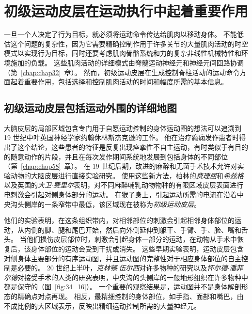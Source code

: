 \section{初级运动皮层在运动执行中起着重要作用}

一旦一个人决定了行为目标，就必须将运动命令传达给肌肉以移动身体。
不能低估这个问题的复杂性，因为它需要精确控制作用于许多关节的大量肌肉活动的时空模式以实现行为目标，同时还要考虑肌肉骨骼系统和力的复杂非线性机械特性和环境施加的负载。
这些肌肉活动的详细模式由脊髓运动神经元和神经元间回路协调（第~\ref{chap:chap32}~章）。
然而，初级运动皮层在生成控制脊柱活动的运动命令方面起着重要作用，包括选择和控制肌肉活动的时间和幅度所需的基本信息。



\subsection{初级运动皮层包括运动外围的详细地图}

大脑皮层的局部区域包含专门用于自愿运动控制的身体运动图的想法可以追溯到 19 世纪中叶英国神经学家约翰休林斯杰克逊的工作。
他在治疗癫痫发作患者时得出了这个结论，这些患者的特征是反复出现痉挛性不自主运动，有时类似于有目的的随意动作的片段，并且在每次发作期间系统地发展到包括身体的不同部位（第~\ref{chap:chap58}~章）。
在 19 世纪后期，改进的麻醉和无菌手术技术允许对实验动物的大脑皮层进行直接实验研究。
使用这些新方法，柏林的\textit{费理屈}和\textit{希兹格}以及英国的\textit{大卫$\cdot$费里尔}表明，对不同麻醉哺乳动物物种的有限区域皮层表面进行电刺激会引起对侧身体部分的运动。
在猴子身上，引起运动所需的电流在沿着中央沟头侧岸的一条窄带中最低，该区域现在被称为\textit{初级运动皮层}。


他们的实验表明，在这条组织带内，对相邻部位的刺激会引起相邻身体部位的运动，从内侧的脚、腿和尾巴开始，然后向外侧延伸到躯干、手臂、手、脸、嘴和舌头。
当他们损伤皮层部位时，刺激会引起身体一部分的运动，在动物从手术中恢复后，该身体部位的运动会受到干扰或消失。
这些早期实验表明，运动皮层包含对侧身体主要部分的有序运动图，并且运动图的完整性对于相应身体部位的自主控制是必要的。
20 世纪上半叶，\textit{克林顿$\cdot$伍尔西}对许多物种的研究以及\textit{怀尔德$\cdot$潘菲尔德}对接受手术的人类的研究表明，中央沟的头侧岸的一般地形组织在许多物种中都是保守的（图~\ref{fig:34_16}）。
一个重要的观察结果是，运动图并不是身体解剖形态的精确点对点再现。
相反，最精细控制的身体部位，如手指、面部和嘴巴，由不成比例的大区域表示，反映出精细运动控制所需的大量神经元。


